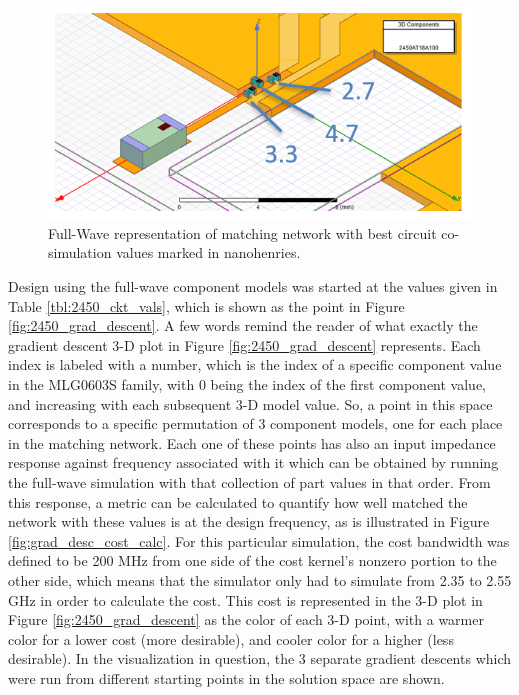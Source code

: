 \documentclass[12pt]{usfcoe}
\begin{document}
    \begin{figure}[H]
		\begin{center}
        	\includegraphics[width=\textwidth]{images/2450_reconfig/full_wave_match_circuit_vals.PNG} 
			\caption{Full-Wave representation of matching network with best circuit co-simulation values marked in nanohenries.} 
			\label{fig:full_wave_match_circuit_vals}
		\end{center}
	\end{figure}    
	
	Design using the full-wave component models was started at the values given in Table \ref{tbl:2450_ckt_vals}, which is shown as the point in Figure \ref{fig:2450_grad_descent}. 
	A few words remind the reader of what exactly the gradient descent 3-D plot in Figure \ref{fig:2450_grad_descent} represents. 
	Each index is labeled with a number, which is the index of a specific component value in the MLG0603S family, with 0 being the index of the first component value, and increasing with each subsequent 3-D model value. 
	So, a point in this space corresponds to a specific permutation of 3 component models, one for each place in the matching network. 
	Each one of these points has also an input impedance response against frequency associated with it which can be obtained by running the full-wave simulation with that collection of part values in that order.
	From this response, a metric can be calculated to quantify how well matched the network with these values is at the design frequency, as is illustrated in Figure \ref{fig:grad_desc_cost_calc}.
	For this particular simulation, the cost bandwidth was defined to be 200 MHz from one side of the cost kernel's nonzero portion to the other side, which means that the simulator only had to simulate from 2.35 to 2.55 GHz in order to calculate the cost.
    This cost is represented in the 3-D plot in Figure \ref{fig:2450_grad_descent} as the color of each 3-D point, with a warmer color for a lower cost (more desirable), and cooler color for a higher (less desirable).
    In the visualization in question, the 3 separate gradient descents which were run from different starting points in the solution space are shown. 
	
\end{document}
